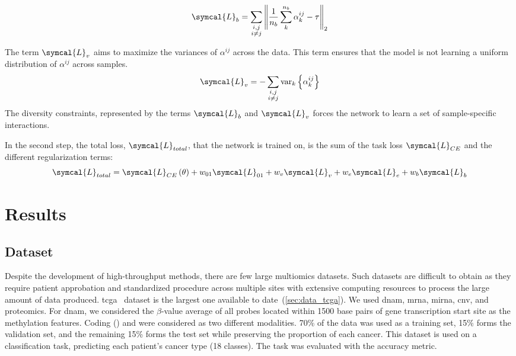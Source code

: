 \documentclass[../main.tex]{subfiles}
\begin{document}
		\[ \symcal{L}_{b} = \sum_{\substack{i,j \\ i \neq j}} \left\|\frac{1}{n_b}\sum_{k}^{n_b}\alpha^{ij}_k - \tau \right\|_2\]

		The term \(\symcal{L}_{v}\) aims to maximize the variances of \(\alpha^{ij}\) across the data.
		This term ensures that the model is not learning a uniform distribution of \(\alpha^{ij}\) across samples.
		\[ \symcal{L}_{v} = - \sum_{\substack{i,j \\ i \neq j}} \operatorname{var}_k\left\{\alpha^{ij}_{k} \right\}\]
		The diversity constraints, represented by the terms \(\symcal{L}_{b}\) and \(\symcal{L}_{v}\) forces the network to learn a set of sample-specific interactions.

		In the second step, the total loss, \(\symcal{L}_{total}\), that the network is trained on, is the sum of the task loss \(\symcal{L}_{CE}\) and the different regularization terms:
		\[ \symcal{L}_{total} = \symcal{L}_{CE}\left(\theta\right) + w_{01}\symcal{L}_{01} + w_{v}\symcal{L}_{v} + w_{e}\symcal{L}_{e} + w_{b}\symcal{L}_{b}\]


\section{Results}
	\subsection{Dataset}
		Despite the development of high-throughput methods, there are few large multiomics datasets.
		Such datasets are difficult to obtain as they require patient approbation and standardized procedure across multiple sites with extensive computing resources to process the large amount of data produced.
		\Gls{tcga}~\cite{TCGA} dataset is the largest one available to date~(\cref{sec:data_tcga}).
		We used \gls{dnam}, \gls{mrna}, \gls{mirna}, \gls{cnv}, and proteomics.
		For \gls{dnam}, we considered the \(\beta\)-value average of all probes located within 1500 base pairs of gene transcription start site as the methylation features.
		Coding () and  were considered as two different modalities.
		70\% of the data was used as a training set, 15\% forms the validation set, and the remaining 15\% forms the test set while preserving the proportion of each cancer.
		This dataset is used on a classification task, predicting each patient's cancer type (18 classes).
		The task was evaluated with the accuracy metric.
\end{document}
